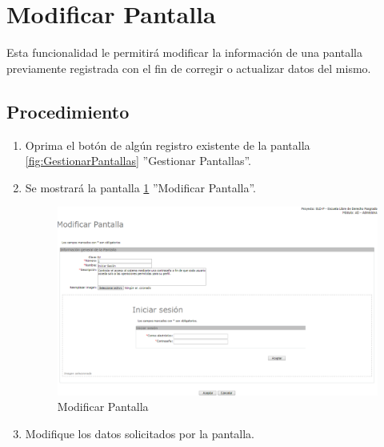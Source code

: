 \hypertarget{cv:modificarPantalla}{\section{Modificar Pantalla}} \label{sec:modificarPantalla}

	Esta funcionalidad le permitirá modificar la información de una pantalla previamente registrada con el fin de corregir o actualizar datos del mismo. 

		\subsection{Procedimiento}

			\begin{enumerate}
	
			\item Oprima el botón \IUEditar{} de algún registro existente de la pantalla \ref{fig:GestionarPantallas} ''Gestionar Pantallas''.
	
			\item Se mostrará la pantalla \ref{fig:modificarPantalla} ''Modificar Pantalla''.
			
			\begin{figure}[htbp!]
				\begin{center}
					\includegraphics[scale=0.5]{roles/lider/pantallas/pantallas/IU11-2modificarPantalla}
					\caption{Modificar Pantalla}
					\label{fig:modificarPantalla}
				\end{center}
			\end{figure}
		
			\item Modifique los datos solicitados por la pantalla.
						

\end{enumerate}
